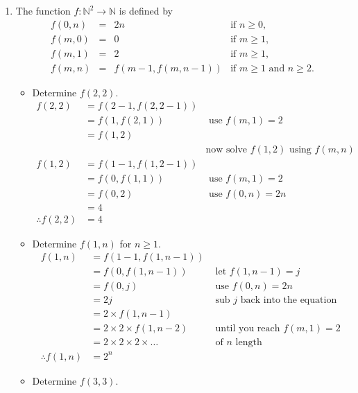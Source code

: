 \documentclass{article}
\newcommand{\IN}{\mathbb{N}}
\begin{document}
\begin{enumerate}
		\item %
			The function $f : \IN^2 \rightarrow \IN$ is defined by 
			\[ \begin{array}{lcll} 
				f(0, n) & = & 2n & \mbox{if $n \geq 0$,} \\ 
				f(m, 0) & = & 0 & \mbox{if $m \geq 1$,} \\ 
				f(m, 1) & = & 2 & \mbox{if $m \geq 1$,} \\ 
				f(m, n) & = & f(m-1,f(m,n-1)) & \mbox{if $m \geq 1$ and $n \geq 2$.}
			\end{array} \] 
			\begin{itemize}
				\item
					Determine $f(2,2)$. \\
					\begin{align*}
						f(2, 2) &= f(2 - 1, f(2, 2 - 1))& \\
						&= f(1, f(2, 1))&\text{ use }f(m, 1) = 2 \\
						&= f(1, 2)& \\
						&&\text{now solve }f(1, 2)\text{ using }f(m, n)\\
						f(1, 2) &= f(1 - 1, f(1, 2 - 1))& \\
						&= f(0, f(1, 1))&\text{ use }f(m, 1) = 2 \\
						&= f(0, 2)&\text{ use }f(0, n) = 2n \\
						&= 4 &\\
						\therefore f(2, 2) &= 4& 
					\end{align*}
				\item
					Determine $f(1,n)$ for $n \geq 1$. \\
					\begin{align*}
						f(1, n) &= f(1 - 1, f(1, n - 1))& \\
						&= f(0, f(1, n - 1))&\text{ let } f(1, n - 1) = j \\
						&= f(0, j)&\text{ use }f(0, n) = 2n \\
						&= 2j&\text{ sub }j\text{ back into the equation} \\
						&= 2 \times f(1, n - 1)& \\
						&= 2 \times 2\times f(1, n - 2)&\text{ until you reach  } f(m, 1) = 2\\
						&= 2 \times 2 \times 2 \times \ldots&\text{ of }n\text{ length }\\
						\therefore f(1, n) &= 2^n
					\end{align*}
				\item
					Determine $f(3,3)$. \\

\end{itemize}
\end{enumerate}
\end{document}
